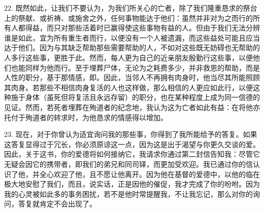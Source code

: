 22. 既然如此，让我们不要认为，为我们所关心的亡者，除了我们隆重恳求的祭台上的祭献、或祈祷、或施舍之外，任何事物能达于他们：虽然并非对为之而行的所有人都得益，而只对那些活着时已赢得使这些事物有益的人。但由于我们无法分辨谁是如此，宜为所有重生者而行，以便没有一个人被遗漏，而这些益处可能且应当达于他们。因为与其缺乏帮助那些需要帮助的人，不如对这些既无妨碍也无帮助的人多行这些事，更胜于此。然而，每人更为自己的近亲朋友殷勤行这些事，以便他们也能同样为他而行。至于埋葬尸体，无论为之耗费多少，并非救恩的帮助，而是人性的职分，基于那情感，即。因此，当邻人不再拥有肉身时，他当尽其所能照顾其肉身。若那些不相信肉身复活的人也这样做，那么相信的人更应如此行，以便这种施于身体（虽死但将复活且永远存留）的职分，也在某种程度上成为同一信德的见证。然而，若死者埋葬在殉道者的纪念地，我认为这为亡者如此有益：在将他亦托付于殉道者的转求时，为他恳求的情感得以增加。\par

23. 现在，对于你曾认为适宜询问我的那些事，你得到了我所能给予的答复。如果这答复显得过于冗长，你必须原谅这一点，因为这是出于渴望与你更久交谈的爱。因此，关于这书，你的爱德将如何接纳它，我请求你通过第二封信告知我：尽管它无疑会因它的携带者，即我们的弟兄和同司铎，而更加受欢迎。我已通过你的信认识了他，并全心欢迎了他，且不愿让他离开。因为他在基督的爱德中，以他的临在极大地安慰了我们，而且，说实话，正是因他的催促，我才完成了你的吩咐。因为我的心灵被如此多的事务困扰，若不是他时常提醒我，不让我忘记，那么对你的询问，答复就肯定不会出现了。\par


